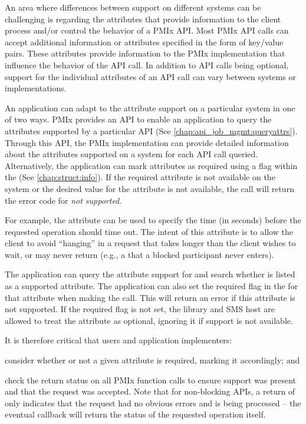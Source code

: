 An area where differences between support on different systems can be challenging is regarding the attributes that provide information to the client process and/or control the behavior of a \ac{PMIx} \ac{API}.  Most
\ac{PMIx} \ac{API} calls can accept additional information or attributes specified in the form of
key/value pairs. These attributes provide information to the \ac{PMIx} implementation that influence the
behavior of the \ac{API} call.  In addition to \ac{API} calls being optional, support for the
individual attributes of an \ac{API} call can vary between systems or implementations.

An application can adapt to the attribute support on a particular system in one of two ways.
\ac{PMIx} provides an \ac{API} to enable an application to query the attributes
supported by a particular \ac{API} (See \ref{chap:api_job_mgmt:queryattrs}).
Through this \ac{API}, the \ac{PMIx} implementation can provide detailed information
about the attributes supported on a system for each \ac{API} call queried.
Alternatively, the application can mark attributes as
required using a flag within the  (See \ref{chap:struct:info}).
If the required attribute is
not available on the system or the desired value for the attribute is not available, the call will
return the error code for \textit{not supported}.

For example, the  attribute can be used to specify the time (in seconds) before the requested operation should time out. The intent of this attribute is to allow the client to avoid ``hanging'' in a request that takes longer than the client wishes to wait, or may never return (e.g., a  that a blocked participant never enters).

The application can query the attribute support for 
and search whether  is listed as a supported attribute.  The application can also
set the required flag in the  for that attribute when making the 
call. This will return an error if this attribute is not supported. If the required flag is not set,
the library and \ac{SMS} host are allowed to treat the attribute as optional, ignoring it if support
is not available.

It is therefore critical that users and application implementers:

\begin{compactalphaenum}
\item consider whether or not a given attribute is required, marking it accordingly; and

\item check the return status on all \ac{PMIx} function calls to ensure support was present and that the request was accepted. Note that for non-blocking \acp{API}, a return of  only indicates that the request had no obvious errors and is being processed – the eventual callback will return the status of the requested operation itself.
\end{compactalphaenum}

